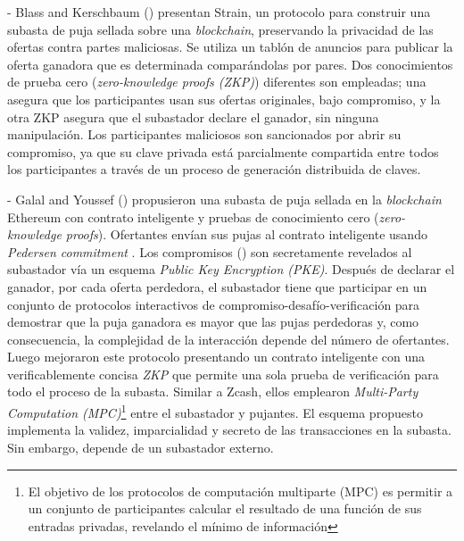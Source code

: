     - Blass and Kerschbaum (\citeyear{blass2017strain}) presentan Strain, un protocolo para construir una subasta de puja sellada sobre
    una \textit{blockchain}, preservando la privacidad de las ofertas contra partes maliciosas. Se utiliza un tablón
    de anuncios para publicar la oferta ganadora que es determinada comparándolas por pares. Dos 
    conocimientos de prueba cero (\textit{zero-knowledge proofs (ZKP)}) diferentes son empleadas; una 
    asegura que los 
    participantes usan sus ofertas originales, bajo compromiso, y la otra ZKP asegura que el
    subastador declare el ganador, sin ninguna manipulación. Los participantes maliciosos son sancionados 
    por abrir su compromiso, ya que su clave privada está parcialmente compartida entre todos los 
    participantes a través de un proceso de generación distribuida de claves.


    - Galal and Youssef (\citeyear{galalyusef2018a}) propusieron una subasta de puja sellada en la \textit{blockchain} Ethereum con contrato 
    inteligente y pruebas de conocimiento cero (\textit{zero-knowledge proofs}). Ofertantes envían sus pujas al contrato inteligente usando
    \textit{Pedersen commitment} \parencite{pedersen1991}. Los compromisos () son secretamente revelados al subastador vía
    un esquema \textit{Public Key Encryption (PKE)}. Después de declarar el ganador, por cada oferta 
    perdedora, el subastador tiene que
    participar en un conjunto de protocolos interactivos de compromiso-desafío-verificación para demostrar 
    que la puja ganadora es mayor que 
    las pujas perdedoras y, como consecuencia, la complejidad de la interacción depende del número de ofertantes. Luego 
    \parencite{galalyusef2018b} mejoraron este protocolo presentando un contrato inteligente con una verificablemente concisa \textit{ZKP}
    que permite una sola prueba de verificación para todo el proceso de la subasta. Similar a Zcash, ellos emplearon \textit{Multi-Party 
    Computation (MPC)}\footnote{El objetivo de los protocolos de computación multiparte (MPC) es
    permitir a un conjunto de participantes calcular el resultado
    de una función de sus entradas privadas, revelando el mínimo
    de información} entre el subastador y pujantes. El esquema propuesto implementa la validez, imparcialidad
    y secreto de las transacciones en la subasta. Sin embargo, depende de un subastador externo.
    
